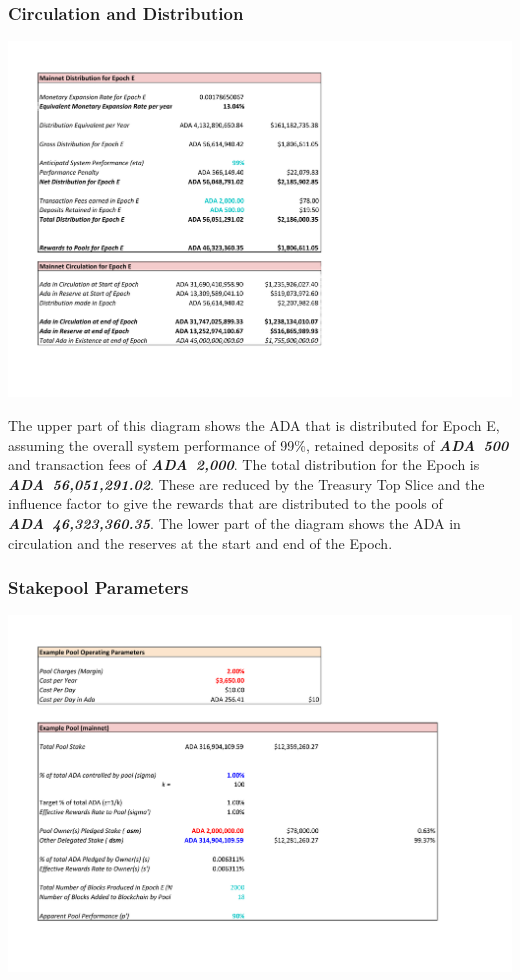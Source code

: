 \documentclass[11pt,a4paper,dvipsnames,twosided,final]{article}
\newcommand{\ada}{ADA{}}
\newcommand{\ADA}[1]{\textbf{\emph{\ada~{#1}}}}
\begin{document}
\subsubsection*{Circulation and Distribution}

\hspace{-0.65in}
\includegraphics[width=1.6\textwidth]{RCM2.pdf}

\noindent
The upper part of this diagram shows the \ada{} that is distributed for Epoch E, assuming the overall system performance of 99\%,
retained deposits of \ADA{500} and transaction fees of \ADA{2,000}.  The total distribution for the
Epoch is \ADA{56,051,291.02}.  These are reduced by the Treasury Top Slice and the influence factor
to give the rewards that are distributed to the pools of \ADA{46,323,360.35}.
%
The lower part of the diagram shows the \ada{} in circulation and the reserves at the start and end of the Epoch.

\subsubsection*{Stakepool Parameters}

\hspace{-0.65in}
\includegraphics[width=1.25\textwidth]{RCM3.pdf}
\end{document}
